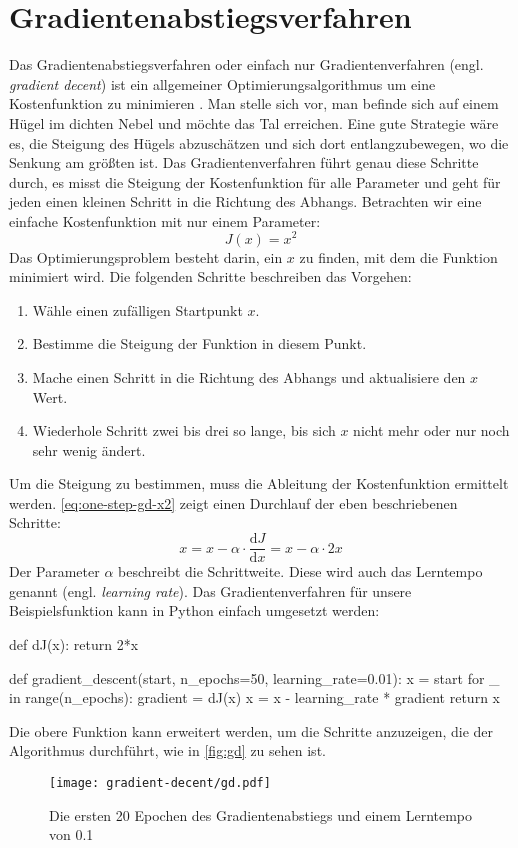 \chapter{Gradientenabstiegsverfahren}
\label{appx:gradient-descent}
Das Gradientenabstiegsverfahren oder einfach nur Gradientenverfahren
(engl. \textit{gradient decent})
ist ein allgemeiner Optimierungsalgorithmus
um eine Kostenfunktion zu minimieren \parencite[118]{book:hands-on-ml}.
Man stelle sich vor, man befinde sich auf einem Hügel im dichten Nebel
und möchte das Tal erreichen.
Eine gute Strategie wäre es, die Steigung des
Hügels abzuschätzen und sich dort entlangzubewegen,
wo die Senkung am größten ist.
Das Gradientenverfahren führt genau diese Schritte durch,
es misst die Steigung der Kostenfunktion für alle Parameter
und geht für jeden einen kleinen Schritt in die Richtung des Abhangs.
Betrachten wir eine einfache Kostenfunktion
mit nur einem Parameter:
\begin{equation*}
  J(x) = x^2 
\end{equation*}
Das Optimierungsproblem besteht darin, ein $x$ zu finden,
mit dem die Funktion minimiert wird.
Die folgenden Schritte beschreiben das Vorgehen:
\begin{enumerate}
  \item Wähle einen zufälligen Startpunkt $x$.
  \item Bestimme die Steigung der Funktion in diesem Punkt.
  \item Mache einen Schritt in die Richtung des Abhangs und aktualisiere den $x$ Wert.
  \item Wiederhole Schritt zwei bis drei so lange,
        bis sich $x$ nicht mehr oder nur noch sehr wenig ändert.
\end{enumerate}
Um die Steigung zu bestimmen, muss die Ableitung der Kostenfunktion ermittelt werden.
\autoref{eq:one-step-gd-x2} zeigt einen Durchlauf der eben beschriebenen Schritte:
\begin{equation}
  x = x - \alpha \cdot \frac{\mathrm{d}J}{\mathrm{d}x} = x - \alpha \cdot 2x
  \label{eq:one-step-gd-x2}
\end{equation}
Der Parameter $\alpha$ beschreibt die Schrittweite. Diese wird auch das
Lerntempo genannt (engl. \textit{learning rate}).
Das Gradientenverfahren für unsere Beispielsfunktion kann in Python 
einfach umgesetzt werden:
\begin{pythoncode}
def dJ(x):
    return 2*x

def gradient_descent(start, n_epochs=50, learning_rate=0.01):
    x = start
    for _ in range(n_epochs):
        gradient = dJ(x)
        x = x - learning_rate * gradient
    return x
\end{pythoncode}
Die obere Funktion kann erweitert werden, um die Schritte anzuzeigen,
die der Algorithmus durchführt, wie in \autoref{fig:gd} zu sehen ist.
\begin{figure}[h!]
  \centering
  \texttt{[image: gradient-decent/gd.pdf]}
  \caption{Die ersten 20 Epochen des Gradientenabstiegs und einem Lerntempo von \num{0.1}}
  \label{fig:gd}
\end{figure}

